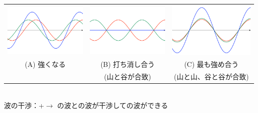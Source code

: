\begin{center}
\begin{tabular}{ccc}
\includegraphics[scale=0.1]{01_Wave/interference1.eps}&
\includegraphics[scale=0.1]{01_Wave/interference2.eps}&
\includegraphics[scale=0.1]{01_Wave/interference3.eps}\\
(A) 強くなる
& (B) 打ち消し合う
& (C) 最も強め合う\\
& (山と谷が合致) & (山と山、谷と谷が合致)
\end{tabular}\\
\bigskip
波の干渉：{\color{red}}+{\color{green}}$\rightarrow${\color{blue}}
\qquad
{\color{red}}の波と{\color{green}}の波が干渉して{\color{blue}}の波ができる
\end{center}

